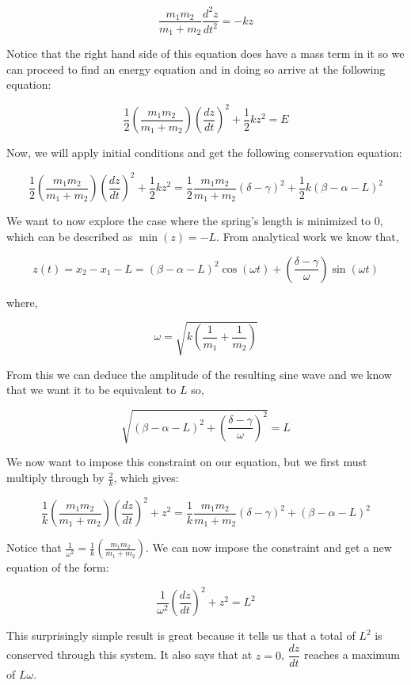 \documentclass[11pt, oneside]{article}   	%
\begin{document}
$$\frac{m_1m_2}{m_1+m_2}\frac{d^2z}{dt^2}=-kz$$

Notice that the right hand side of this equation does have a mass term in it so we can proceed to find an energy equation and in doing so arrive at the following equation:

$$\frac{1}{2}\left(\frac{m_1m_2}{m_1+m_2}\right)\left(\frac{dz}{dt}\right)^2 +\frac{1}{2}kz^2=E$$

Now, we will apply initial conditions and get the following conservation equation:

$$\frac{1}{2}\left(\frac{m_1m_2}{m_1+m_2}\right)\left(\frac{dz}{dt}\right)^2 +\frac{1}{2}kz^2=\frac{1}{2}\frac{m_1m_2}{m_1+m_2}\left(\delta -\gamma\right)^2+\frac{1}{2}k\left(\beta -\alpha -L\right)^2$$

We want to now explore the case where the spring's length is minimized to 0, which can be described as $\min(z)=-L$.
From analytical work we know that,

$$\displaystyle{z(t)=x_2-x_1-L=(\beta -\alpha -L)^2\cos{(\omega t)}+\left(\frac{\delta -\gamma}{\omega}\right)\sin{(\omega t)}}$$

where, 

$$\displaystyle{\omega = \sqrt{k\left(\frac{1}{m_1}+\frac{1}{m_2}\right)}}$$

From this we can deduce the amplitude of the resulting sine wave and we know that we want it to be equivalent to $L$ so,

$$\sqrt{(\beta -\alpha -L)^2+\left(\frac{\delta - \gamma}{\omega}\right)^2}=L$$

We now want to impose this constraint on our equation, but we first must multiply through by $\frac{2}{k}$, which gives:

$$\frac{1}{k}\left(\frac{m_1m_2}{m_1+m_2}\right)\left(\frac{dz}{dt}\right)^2 +z^2=\frac{1}{k}\frac{m_1m_2}{m_1+m_2}\left(\delta -\gamma\right)^2+\left(\beta -\alpha -L\right)^2$$

Notice that $\displaystyle{\frac{1}{\omega^2}}=\frac{1}{k}\left(\frac{m_1m_2}{m_1+m_2}\right)$. We can now impose the constraint and get a new equation of the form:

$$\frac{1}{\omega^2}\left(\frac{dz}{dt}\right)^2+z^2=L^2$$

This surprisingly simple result is great because it tells us that a total of $L^2$ is conserved through this system. It also says that at $z=0$, $\dfrac{dz}{dt}$ reaches a maximum of $L\omega$.
\newpage
\end{document}
